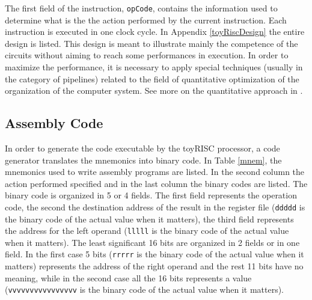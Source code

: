 The first field of the instruction, {\tt opCode}, contains the information used to determine what is the the action performed by  the current instruction.
Each instruction is executed in one clock cycle. In Appendix \ref{toyRiscDesign} the entire design is listed. This design is meant to illustrate mainly the competence of the circuits without aiming to reach some performances in execution. In order to maximize the performance, it is necessary to apply special techniques (usually in the category of pipelines) related to the field of quantitative optimization of the organization of the computer system. See more on the quantitative approach in \citep{Hennessy19}.

\subsection{Assembly Code}

In order to generate the code executable by the toyRISC processor, a code generator  translates the mnemonics into binary code. In Table \ref{mnem}, the mnemonics used to write assembly programs are listed. In the second column the action performed specified and in the last column the binary codes are listed. The binary code is organized in 5 or 4 fields.  The first field represents the operation code, the second the destination address of the result  in the register file ({\tt ddddd} is the binary code of the actual value when it matters), the third field represents the address for the left operand ({\tt lllll} is the binary code of the actual value when it matters). The least significant 16 bits are organized in 2 fields or in one field. In the first case 5 bits ({\tt rrrrr} is the binary code of the actual value when it matters) represents the address of the right operand and the rest 11 bits have no meaning, while in the second case all the 16 bits represents a value ({\tt vvvvvvvvvvvvvvvv} is the binary code of the actual value when it matters).

